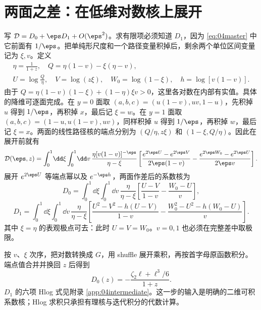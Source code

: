 \section{两面之差：在低维对数核上展开}
写 $\mathcal D=D_0+\eps D_1+O(\eps^2)$。求有限项必须知道 $D_1$，因为 \eqref{eq:04master} 中它前面有 $1/\eps$。把单纯形尺度和一个路径变量积掉后，剩余两个单位区间变量记为 $\xi,v$。定义
\begin{gather}
\eta=\frac1{1+z},\quad Q=\eta(1-v)-\xi(\eta-v),\\
U=\log\frac Q\eta,\quad V=\log(z\xi),\quad W_0=\log(1-\xi),\quad h=\log[v(1-v)].
\end{gather}
由于 $Q=\eta(1-v)(1-\xi)+(1-\eta)\xi v>0$，这里各对数在内部有实值。具体的降维可逐面完成。在 $y=0$ 面取 $(a,b,c)=(u(1-v),uv,1-u)$，先积掉 $u$ 得到 $1/\eps$，再积掉 $x$，最后记 $\xi=w$。在 $y=1$ 面取 $(a,b,c)=(1-u,u(1-v),uv)$，同样积掉 $u$ 得到 $1/\eps$，再积掉 $w$，最后记 $\xi=x$。两面的线性路径核的端点分别为 $(Q/\eta,z\xi)$ 和 $(1-\xi,Q/\eta)$。因此在展开前就有
\begin{equation}
\begin{aligned}
\mathcal D(\eps,z)=\int_0^1\!\dd\xi\int_0^1\!\dd v\,
\frac{\eta[v(1-v)]^{-\eps}}{\eta-\xi}
\left[\frac{e^{2\eps U}-e^{2\eps V}}{2\eps(1-v)}
-\frac{e^{2\eps W_0}-e^{2\eps U}}{2\eps v}\right].
\end{aligned}
\end{equation}
展开 $e^{2\eps U}$ 等端点幂以及 $e^{-\eps h}$，两面作差后的系数核为
\begin{equation}
D_0=\int_0^1\!\dd\xi\int_0^1\!\dd v\,
\frac{\eta}{\eta-\xi}
\left[\frac{U-V}{1-v}-\frac{W_0-U}{v}\right],
\label{eq:D0kernel}
\end{equation}
\begin{equation}
D_1=\int_0^1\!\dd\xi\int_0^1\!\dd v\,
\frac{\eta}{\eta-\xi}
\left[\frac{U^2-V^2-h(U-V)}{1-v}
-\frac{W_0^2-U^2-h(W_0-U)}{v}\right].
\end{equation}
其中 $\xi=\eta$ 的表观极点可去：此时 $U=V=W_0$。$v=0,1$ 也必须在完整差中取极限。

按 $v$、$\xi$ 次序，把对数转换成 $G$，用 shuffle 展开乘积，再按首字母原函数积分。端点值合并并换回 $z$ 后得到
\begin{equation}
D_0(z)=-\frac{\zeta_2\ell+\ell^3/6}{1+z}.
\label{eq:D0result}
\end{equation}
$D_1$ 的六项 Hlog 式见附录 \ref{app:04intermediate}。这一步的输入是明确的二维可积系数核；Hlog 求积只承担有理核与迭代积分的代数计算。

